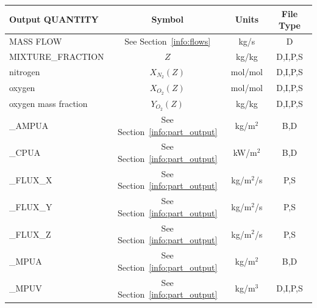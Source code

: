 \documentclass[11pt]{book}
\begin{document}
\begin{table}[h!]
\begin{center}
\begin{tabular}{|l|c|c|c|}
\hline
Output {\ct QUANTITY}                           & Symbol                                        & Units          & File Type    \\ \hline \hline
{\ct MASS FLOW}                                 & See Section~\ref{info:flows}                  & kg/s           & D            \\ \hline
{\ct MIXTURE\_FRACTION}                         & $Z$                                           & kg/kg          & D,I,P,S      \\ \hline
{\ct nitrogen}                                  & $X_{N_2}(Z)$                                  & mol/mol        & D,I,P,S      \\ \hline
{\ct oxygen}                                    & $X_{O_2}(Z)$                                  & mol/mol        & D,I,P,S      \\ \hline
{\ct oxygen mass fraction}                      & $Y_{O_2}(Z)$                                  & kg/kg          & D,I,P,S      \\ \hline
{\ct [PART\_ID]\_AMPUA}                         & See Section~\ref{info:part_output}            & kg/m$^2$       & B,D          \\ \hline
{\ct [PART\_ID]\_CPUA}                          & See Section~\ref{info:part_output}            & kW/m$^2$       & B,D          \\ \hline
{\ct [PART\_ID]\_FLUX\_X}                       & See Section~\ref{info:part_output}            & kg/m$^2$/s     & P,S          \\ \hline
{\ct [PART\_ID]\_FLUX\_Y}                       & See Section~\ref{info:part_output}            & kg/m$^2$/s     & P,S          \\ \hline
{\ct [PART\_ID]\_FLUX\_Z}                       & See Section~\ref{info:part_output}            & kg/m$^2$/s     & P,S          \\ \hline
{\ct [PART\_ID]\_MPUA}                          & See Section~\ref{info:part_output}            & kg/m$^2$       & B,D          \\ \hline
{\ct [PART\_ID]\_MPUV}                          & See Section~\ref{info:part_output}            & kg/m$^3$       & D,I,P,S      \\ \hline

\end{tabular}
\end{center}
\end{table}
\end{document}
